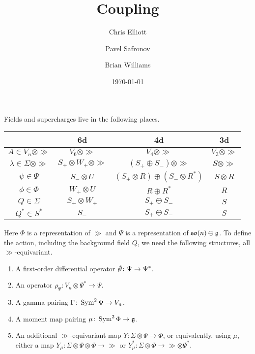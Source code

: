 \documentclass[10pt, oneside]{article}
\title{Coupling}
\author{Chris Elliott\and Pavel Safronov \and Brian Williams}
\date{\today}
\begin{document}
Fields and supercharges live in the following places.

\begin{table}[!h]
\centering
\begin{tabular}[!h]{c|c|c|c}
&6d&4d&3d \\
\hline
$A \in V_n \otimes \gg$& $V_6 \otimes \gg$ &$V_4 \otimes \gg$ & $V_3 \otimes \gg$ \\
$\lambda \in \Sigma \otimes \gg$ &$S_+ \otimes W_+ \otimes \gg$ & $(S_+ \oplus S_-) \otimes \gg$ & $S \otimes \gg$ \\
$\psi \in \Psi$ & $S_- \otimes U$ & $(S_+ \otimes R) \oplus (S_- \otimes R^*)$ & $S \otimes R$ \\
$\phi \in \Phi$ & $W_+ \otimes U$ & $R \oplus R^*$ & $R$ \\
$Q \in \Sigma$ & $S_+ \otimes W_+$ & $S_+ \oplus S_-$ & $S$ \\
$Q^* \in S^*$ & $S_-$ & $S_+ \oplus S_-$ & $S$
\end{tabular}
\end{table}

Here $\Phi$ is a representation of $\gg$ and $\Psi$ is a representation of $\mathfrak{so}(n) \oplus \mathfrak{g}$.  To define the action, including the background field $Q$, we need the following structures, all $\gg$-equivariant. 
\begin{enumerate}
 \item A first-order differential operator $\sd \dd \colon \Psi \to \Psi^*$.
 \item An operator $\rho_\Psi \colon V_n \otimes \Psi^* \to \Psi$.
 \item A gamma pairing $\Gamma \colon \operatorname{Sym}^2 \Psi \to V_n$.
 \item A moment map pairing $\mu \colon \operatorname{Sym}^2 \Phi \to \mathfrak{g}$.
 \item An additional $\gg$-equivariant map $Y \colon \Sigma \otimes \Psi \to \Phi$, or equivalently, using $\mu$, either a map $Y_\mu\colon \Sigma \otimes \Psi \otimes \Phi \to \gg$ or $Y_\mu^* \colon \Sigma \otimes \Phi \to \gg \otimes \Psi^*$.
\end{enumerate}
\end{document}
